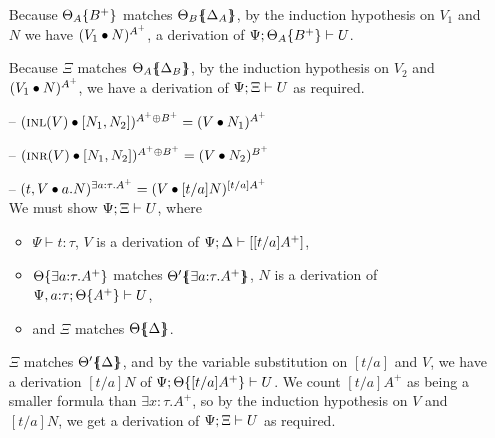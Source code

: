 \begin{itemize}

  Because ${\Theta_A}\{{B^+}\}$ matches ${\Theta_B}\mbox{$\{\hspace{-4pt}\{$}{\Delta_A}\mbox{$\}\hspace{-4pt}\}$}$,
  by the induction hypothesis on $V_1$ and $N$ we have
  $({V_1} \bullet {N})^{A^+}$, a derivation of 
  ${\Psi};{{\Theta_A}\{{B^+}\}} \vdash {U}$.

  Because $\Xi$ matches ${\Theta_A}\mbox{$\{\hspace{-4pt}\{$}{\Delta_B}\mbox{$\}\hspace{-4pt}\}$}$, by the induction
  hypothesis on $V_2$ and $({V_1} \bullet {N})^{A^+}$, we have a derivation
  of ${\Psi};{\Xi} \vdash {U}$ as required. \smallskip

\item[--] $({\textsc{inl}({V})} \bullet {[{N_1},{N_2}]})^{A^+ \oplus B^+} 
           = ({V} \bullet {N_1})^{A^+}$

\item[--] $({\textsc{inr}({V})} \bullet {[{N_1},{N_2}]})^{A^+ \oplus B^+} 
           = ({V} \bullet {N_2})^{B^+}$

\item[--] $({{t},{V}} \bullet {{a}.{N}})^{\exists a{:}\tau.A^+}
           = ({V} \bullet {[t/a]N})^{[t/a]A^+}$ \smallskip\\
  We must show ${\Psi};{\Xi} \vdash {U}$, where
  \begin{itemize}
  \item $\Psi \vdash t : \tau$, $V$ is a derivation of 
     ${\Psi};{\Delta} \vdash {[[t/a]A^+]}$,
  \item ${\Theta}\{{\exists a{:}\tau. A^+}\}$ 
     matches ${\Theta'}\mbox{$\{\hspace{-4pt}\{$}{\exists a{:}\tau. A^+}\mbox{$\}\hspace{-4pt}\}$}$, 
     $N$ is a derivation of 
     ${\Psi, a{:}\tau};{{\Theta}\{{A^+}\}} \vdash {U}$,
  \item and $\Xi$ matches ${\Theta}\mbox{$\{\hspace{-4pt}\{$}{\Delta}\mbox{$\}\hspace{-4pt}\}$}$.
  \end{itemize}
  $\Xi$ matches ${\Theta'}\mbox{$\{\hspace{-4pt}\{$}{\Delta}\mbox{$\}\hspace{-4pt}\}$}$, and by the variable
  substitution on $[t/a]$ and $V$, we have a derivation $[t/a]N$ of
  ${\Psi};{{\Theta}\{{[t/a]A^+}\}} \vdash {U}$.  We count $[t/a]A^+$ as
  being a smaller formula than $\exists x{:}\tau.A^+$, so by the
  induction hypothesis on $V$ and $[t/a]N$, we get a derivation of
  ${\Psi};{\Xi} \vdash {U}$ as required. \smallskip


\end{itemize}

